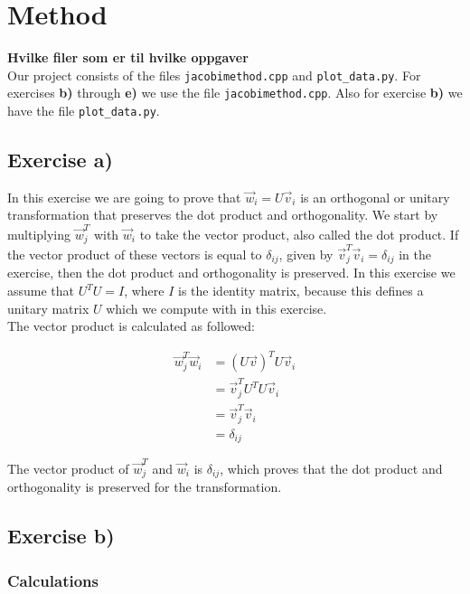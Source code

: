 \documentclass{article}
\begin{document}
\section{Method} \label{sec:Method}

\textbf{Hvilke filer som er til hvilke oppgaver} \\

Our project consists of the files \texttt{jacobimethod.cpp} and \texttt{plot\_data.py}. For exercises \textbf{b)} through \textbf{e)} we use the file \texttt{jacobimethod.cpp}. Also for exercise \textbf{b)} we have the file \texttt{plot\_data.py}.

\subsection{Exercise a)} \label{sec:Method a)}

In this exercise we are going to prove that $\vec{w}_i = U \vec{v}_i$ is an orthogonal or unitary transformation that preserves the dot product and orthogonality. We start by multiplying $\vec{w}_j ^T$ with $\vec{w}_i$ to take the vector product, also called the dot product. If the vector product of these vectors is equal to $\delta_{ij}$, given by $\vec{v}_j ^T \vec{v}_i = \delta_{ij}$ in the exercise, then the dot product and orthogonality is preserved. In this exercise we assume that $U^T U = I$, where $I$ is the identity matrix, because this defines a unitary matrix $U$ which we compute with in this exercise. \\

The vector product is calculated as followed:

\begin{align*}
  \vec{w}_j ^T \vec{w}_i &= (U \vec{v})^T U \vec{v}_i \\
  &= \vec{v}_j ^T U^T U \vec{v}_i \\
  &= \vec{v}_j ^T \vec{v}_i \\
  &= \delta _{ij}
\end{align*}

The vector product of $\vec{w}_j ^T$ and $\vec{w}_i$ is $\delta_{ij}$, which proves that the dot product and orthogonality is preserved for the transformation.


\subsection{Exercise b)} \label{sec:Method b)}

  \subsubsection{Calculations} \label{sec:Calculations b)}
\end{document}
